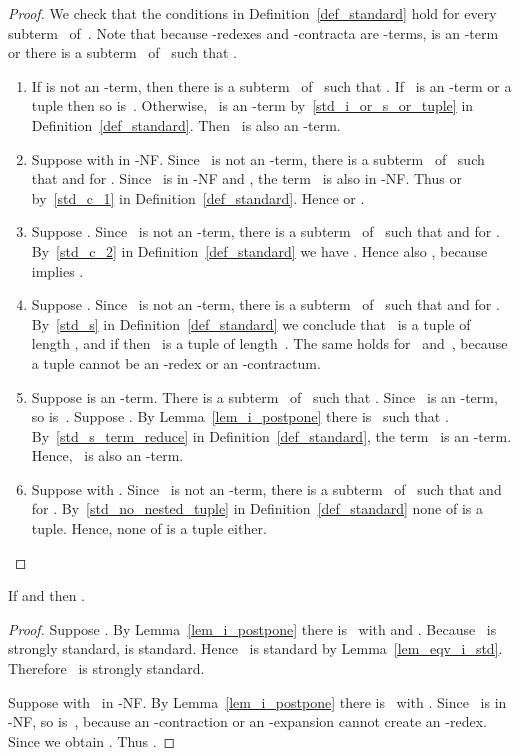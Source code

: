 \documentclass[a4paper,UKenglish]{lipics-v2016}
\begin{document}
\begin{proof}
  We check that the conditions in Definition~\ref{def_standard} hold
  for every subterm~ of~. Note that because -redexes and
  -contracta are -terms,  is an -term or there is a
  subterm~ of~ such that .
  \begin{enumerate}
  \item If  is not an -term, then there is a subterm~ of~
    such that . If~ is an -term or a
    tuple then so is~. Otherwise,~ is an -term
    by~\ref{std_i_or_s_or_tuple} in
    Definition~\ref{def_standard}. Then~ is also an -term.
  \item Suppose  with  in
    -NF. Since~ is not an -term, there is a subterm~
    of~ such that  and
     for . Since~ is in
    -NF and , the term~ is also in
    -NF. Thus  or 
    by~\ref{std_c_1} in Definition~\ref{def_standard}. Hence
     or .
  \item Suppose . Since~ is not an
    -term, there is a subterm~ of~ such that
     and  for
    . By~\ref{std_c_2} in Definition~\ref{def_standard} we
    have . Hence also
    , because
     implies
    .
  \item Suppose . Since~ is not an -term, there is a subterm~
    of~ such that  and
     for . By~\ref{std_s} in
    Definition~\ref{def_standard} we conclude that~ is a tuple of
    length , and if  then~ is a tuple
    of length~. The same holds for~ and~, because a
    tuple cannot be an -redex or an -contractum.
  \item Suppose  is an -term. There is a subterm~ of~
    such that . Since~ is an -term, so
    is~. Suppose . By Lemma~\ref{lem_i_postpone}
    there is~ such that . By~\ref{std_s_term_reduce} in Definition~\ref{def_standard},
    the term~ is an -term. Hence,~ is also an -term.
  \item Suppose  with . Since~ is not an -term, there is a subterm~ of~
    such that  and
     for
    . By~\ref{std_no_nested_tuple} in
    Definition~\ref{def_standard} none of  is a
    tuple. Hence, none of  is a tuple either.
  \end{enumerate}
\end{proof}

\begin{lemma}\label{lem_eqv_i}
  If  and  then .
\end{lemma}

\begin{proof}
  Suppose . By Lemma~\ref{lem_i_postpone} there
  is~ with  and . Because~ is strongly standard,  is
  standard. Hence~ is standard by
  Lemma~\ref{lem_eqv_i_std}. Therefore~ is strongly standard.

  Suppose  with~ in -NF. By
  Lemma~\ref{lem_i_postpone} there is~ with
  . Since~ is in -NF,
  so is~, because an -contraction or an -expansion cannot
  create an -redex. Since  we obtain
  . Thus .
\end{proof}
\end{document}
